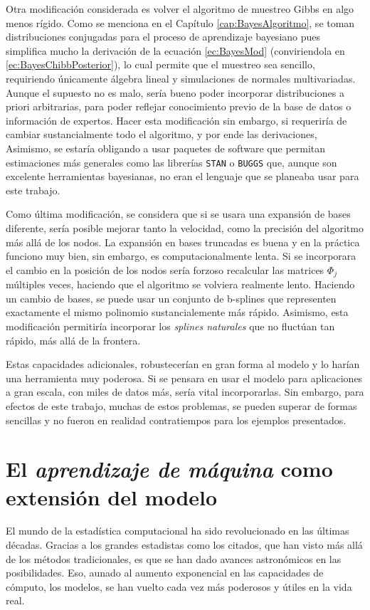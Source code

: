 \documentclass[../Main/Main.tex]{subfiles}
\begin{document}
Otra modificación considerada es volver el algoritmo de muestreo Gibbs en algo menos rígido. Como se menciona en el Capítulo \ref{cap:BayesAlgoritmo}, se toman distribuciones conjugadas para el proceso de aprendizaje bayesiano pues simplifica mucho la derivación de la ecuación \ref{ec:BayesMod} (conviriendola en \ref{ec:BayesChibbPosterior}), lo cual permite que el muestreo sea sencillo, requiriendo únicamente álgebra lineal y simulaciones de normales multivariadas. Aunque el supuesto no es malo, sería bueno poder incorporar distribuciones a priori arbitrarias, para poder reflejar conocimiento previo de la base de datos o información de expertos. Hacer esta modificación sin embargo, si requeriría de cambiar sustancialmente todo el algoritmo, y por ende las derivaciones, Asimismo, se estaría obligando a usar paquetes de software que permitan estimaciones más generales como las librerías \verb|STAN| o \verb|BUGGS| que, aunque son excelente herramientas bayesianas, no eran el lenguaje que se planeaba usar para este trabajo.

Como última modificación, se considera que si se usara una expansión de bases diferente, sería posible mejorar tanto la velocidad, como la precisión del algoritmo más allá de los nodos. La expansión en bases truncadas es buena y en la práctica funciono muy bien, sin embargo, es computacionalmente lenta. Si se incorporara el cambio en la posición de los nodos sería forzoso recalcular las matrices $\Phi_j$ múltiples veces, haciendo que el algoritmo se volviera realmente lento. Haciendo un cambio de bases, se puede usar un conjunto de b-splines que representen exactamente el mismo polinomio sustancialemente más rápido. Asimismo, esta modificación permitiría incorporar los \textit{splines naturales} que no fluctúan tan rápido, más allá de la frontera. 

Estas capacidades adicionales, robustecerían en gran forma al modelo y lo harían una herramienta muy poderosa. Si se pensara en usar el modelo para aplicaciones a gran escala, con miles de datos más, sería vital incorporarlas. Sin embargo, para efectos de este trabajo, muchas de estos problemas, se pueden superar de formas sencillas y no fueron en realidad contratiempos para los ejemplos presentados. 

\section{El \textit{aprendizaje de máquina} como extensión del modelo}
El mundo de la estadística computacional ha sido revolucionado en las últimas décadas. Gracias a los grandes estadistas como los citados, que han visto más allá de los métodos tradicionales, es que se han dado avances astronómicos en las posibilidades. Eso, aunado al aumento exponencial en las capacidades de cómputo, los modelos, se han vuelto cada vez más poderosos y útiles en la vida real.
\end{document}
